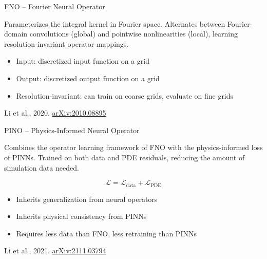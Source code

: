 \documentclass[aspectratio=169]{beamer}
\begin{document}
\begin{frame}{FNO -- Fourier Neural Operator}

  Parameterizes the integral kernel in Fourier space. Alternates between
  Fourier-domain convolutions (global) and pointwise nonlinearities (local),
  learning resolution-invariant operator mappings.

  \begin{itemize}
    \item Input: discretized input function on a grid
    \item Output: discretized output function on a grid
    \item Resolution-invariant: can train on coarse grids, evaluate on fine
      grids
  \end{itemize}

  \vfill
  \hfill{\footnotesize Li et al., 2020.
    \href{https://arxiv.org/abs/2010.08895}{arXiv:2010.08895}}

\end{frame}

\begin{frame}{PINO -- Physics-Informed Neural Operator}

  Combines the operator learning framework of FNO with the physics-informed
  loss of PINNs. Trained on both data and PDE residuals, reducing the amount
  of simulation data needed.

  \begin{equation*}
    \mathcal{L} = \mathcal{L}_{\text{data}} + \mathcal{L}_{\text{PDE}}
  \end{equation*}

  \begin{itemize}
    \item Inherits generalization from neural operators
    \item Inherits physical consistency from PINNs
    \item Requires less data than FNO, less retraining than PINNs
  \end{itemize}

  \vfill
  \hfill{\footnotesize Li et al., 2021.
    \href{https://arxiv.org/abs/2111.03794}{arXiv:2111.03794}}

\end{frame}
\end{document}
